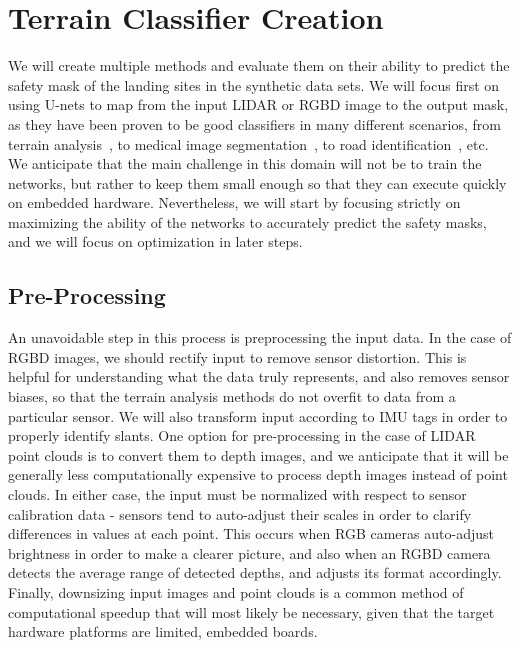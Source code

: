\section{Terrain Classifier Creation}

We will create multiple methods and evaluate them on their ability to predict the
safety mask of the landing sites in the synthetic data sets.
We will focus first on using U-nets to map from the input LIDAR or RGBD image
to the output mask, as they have been proven to be good classifiers in many different scenarios,
from terrain analysis~\cite{unet_semantic_terrain_segmentation}, to medical image segmentation~\cite{unet_medical_image_segmentation}, to road identification~\cite{unet_road_extraction}, etc.
We anticipate that the main challenge in this domain will not be
to train the networks, but rather to keep them small enough
so that they can execute quickly on embedded hardware.
Nevertheless, we will start by focusing strictly on maximizing the ability of the networks
to accurately predict the safety masks, and we will focus on optimization in later steps.

\subsection{Pre-Processing}

An unavoidable step in this process is preprocessing the input data.
In the case of RGBD images, we should rectify input to remove sensor distortion.
This is helpful for understanding what the data truly represents,
and also removes sensor biases, so that the terrain analysis methods do not overfit to data from a particular sensor.
We will also transform input according to IMU tags in order to properly identify slants.
One option for pre-processing in the case of LIDAR point clouds is to convert them to depth images,
and we anticipate that it will be generally less computationally expensive to process depth images instead of point clouds.
In either case, the input must be normalized with respect to sensor calibration data -
sensors tend to auto-adjust their scales in order to clarify differences in values at each point.
This occurs when RGB cameras auto-adjust brightness in order to make a clearer picture,
and also when an RGBD camera detects the average range of detected depths, and adjusts its format accordingly.
Finally, downsizing input images and point clouds is a common method of computational speedup
that will most likely be necessary, given that the target hardware platforms are limited, embedded boards.

